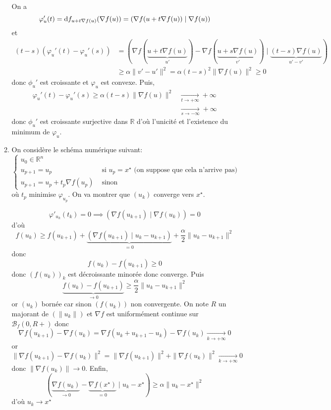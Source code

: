 \begin{enumerate}
\begin{enumerate}
                On a \[
                    \varphi_u'(t)=\mathrm{d} f_{u+t\nabla f(u)}(\nabla f(u))=(\nabla f(u+t\nabla f(u))\;|\;\nabla f(u))
                \]
                et \begin{align*}
                    (t-s)(\varphi_u'(t)-\varphi_u'(s))&=(\nabla f(\underbrace{u+t\nabla f(u)}_{u'})-\nabla f(\underbrace{u+s\nabla f(u)}_{v'})\;|\;\underbrace{(t-s)\nabla f(u)}_{u'-v'}) \\
                                                      &\geq \alpha\|v'-u'\|^2=\alpha(t-s)^2\|\nabla f(u)\|^2\geq 0
                \end{align*}
                donc $\phi_u'$ est croissante et $\varphi_u$ est convexe. Puis, \begin{align*}
                    \varphi_u'(t)-\varphi_u'(s)\geq \alpha(t-s)\|\nabla f(u)\|^2 &\xrightarrow[t\to+\infty]{} +\infty \\ &\xrightarrow[s\to-\infty]{}+\infty
                \end{align*}
                donc $\phi_u'$ est croissante surjective dans $\mathbb R$ d'où l'unicité et l'existence du minimum de $\varphi_u$.
            \item On considère le schéma numérique suivant: \[
                    \begin{cases}
                        u_0\in\mathbb R^n\\
                        u_{p+1}=u_p &\text{ si }u_p=x^\star \text{ (on suppose que cela n'arrive pas) }\\
                        u_{p+1}=u_p+t_p\nabla f(u_p) &\text{ sinon }
                    \end{cases}
                \]
                où $t_p$ minimise $\varphi_{u_p}$. On va montrer que $(u_k)$ converge vers $x^\star$.

                \[
                    \varphi'_{u_k}(t_k)=0\implies (\nabla f(u_{k+1})\;|\;\nabla f(u_k))=0
                \]
                d'où \[
                    f(u_k)\geq f(u_{k+1})+\underbrace{(\nabla f(u_{k+1})\;|\; u_k-u_{k+1})}_{=0}+\frac\alpha2\|u_k-u_{k+1}\|^2
                \]
                donc \[
                    f(u_k)-f(u_{k+1})\geq 0
                \]
                donc $(f(u_k))_k$ est décroissante minorée donc converge. Puis \[
                    \underbrace{f(u_k)-f(u_{k+1})}_{\longrightarrow 0}\geq \frac\alpha2\|u_k-u_{k+1}\|^2
                \]
                or $(u_k)$ bornée car sinon $(f(u_k))$ non convergente. On note $R$ un majorant de $(\|u_k\|)$ et $\nabla f$ est uniformément continue sur $\mathcal B_f (0, R+)$ donc \[
                    \nabla f(u_{k+1})-\nabla f(u_k)=\nabla f(u_k+u_{k+1}-u_k)-\nabla f(u_k) \xrightarrow[k\to+\infty ]{} 0
                \]
                or \[
                    \|\nabla f(u_{k+1})-\nabla f(u_k)\|^2=\|\nabla f(u_{k+1})\|^2+\|\nabla f(u_k)\|^2\xrightarrow[k\to+\infty]{}0
                \]
                donc $\|\nabla f(u_k)\|\to 0$. Enfin, \[
                    (\underbrace{\nabla f(u_k)}_{\to 0}-\underbrace{\nabla f(x^\star)}_{=0}\;|\;u_k-x^\star)\geq \alpha\|u_k-x^\star\| ^2
                \] d'où $u_k\to x^\star$
        \end{enumerate}
\end{enumerate}
